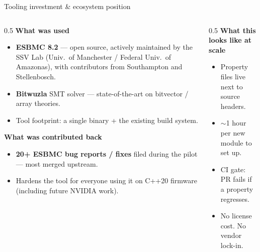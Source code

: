 \documentclass[aspectratio=169,11pt]{beamer}
\newcommand{\hil}[1]{\textbf{\textcolor{nvgreendark}{#1}}}
\begin{document}
\begin{frame}{Tooling investment \& ecosystem position}
  \begin{columns}[T,onlytextwidth]
    \begin{column}{0.5\textwidth}
      \footnotesize
      \textbf{What was used}
      \begin{itemize}\setlength\itemsep{0.1em}
        \item \hil{ESBMC 8.2} — open source, actively maintained by
              the SSV Lab (Univ.\ of Manchester / Federal Univ.\ of
              Amazonas), with contributors from Southampton and
              Stellenbosch.
        \item \hil{Bitwuzla} SMT solver — state-of-the-art on
              bitvector / array theories.
        \item Tool footprint: a single binary + the existing build system.
      \end{itemize}

      \vspace{0.3em}
      \textbf{What was contributed back}
      \begin{itemize}\setlength\itemsep{0.1em}
        \item \hil{20+ ESBMC bug reports / fixes} filed during the
              pilot — most merged upstream.
        \item Hardens the tool for everyone using it on C++20
              firmware (including future NVIDIA work).
      \end{itemize}
    \end{column}

    \begin{column}{0.5\textwidth}
      \footnotesize
      \textbf{What this looks like at scale}
      \begin{itemize}\setlength\itemsep{0.1em}
        \item Property files live next to source headers.
        \item $\sim$1 hour per new module to set up.
        \item CI gate: PR fails if a property regresses.
        \item No license cost. No vendor lock-in.
      \end{itemize}


\end{column}
\end{columns}
\end{frame}
\end{document}
